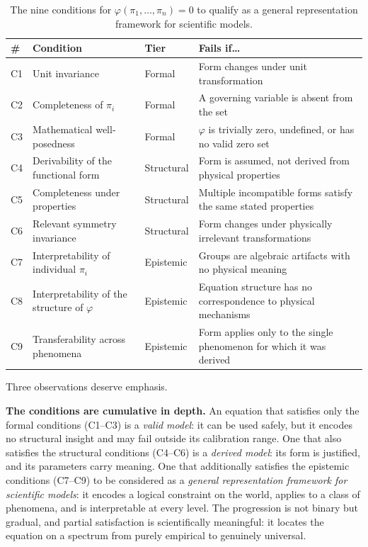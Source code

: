 \begin{table}[ht]
\centering
\caption{The nine conditions for $\varphi(\pi_1,\ldots,\pi_n)=0$
to qualify as a general representation framework for scientific models.}
\label{tab:ucq:conditions}
\renewcommand{\arraystretch}{1.35}
\begin{tabularx}{\textwidth}{%
  >{\centering\arraybackslash}p{0.6cm}
  >{\raggedright\arraybackslash}p{4.0cm}
  >{\raggedright\arraybackslash}p{2.2cm}
  >{\raggedright\arraybackslash}X}
\toprule
\rowcolor{headerbg}
\textbf{\#} & \textbf{Condition} & \textbf{Tier}
            & \textbf{Fails if\ldots} \\
\midrule
C1 & Unit invariance
   & Formal
   & Form changes under unit transformation \\
C2 & Completeness of $\pi_i$
   & Formal
   & A governing variable is absent from the set \\
C3 & Mathematical well-posedness
   & Formal
   & $\varphi$ is trivially zero, undefined, or has no
     valid zero set \\
\midrule
C4 & Derivability of the functional form
   & Structural
   & Form is assumed, not derived from physical properties \\
C5 & Completeness under properties
   & Structural
   & Multiple incompatible forms satisfy the same stated
     properties \\
C6 & Relevant symmetry invariance
   & Structural
   & Form changes under physically irrelevant transformations \\
\midrule
C7 & Interpretability of individual $\pi_i$
   & Epistemic
   & Groups are algebraic artifacts with no physical meaning \\
C8 & Interpretability of the structure of $\varphi$
   & Epistemic
   & Equation structure has no correspondence to physical
     mechanisms \\
C9 & Transferability across phenomena
   & Epistemic
   & Form applies only to the single phenomenon for which
     it was derived \\
\bottomrule
\end{tabularx}
\end{table}

Three observations deserve emphasis.

\medskip

\textbf{The conditions are cumulative in depth.}  An equation that
satisfies only the formal conditions (C1--C3) is a \emph{valid
model}: it can be used safely, but it encodes no structural insight
and may fail outside its calibration range.  One that also
satisfies the structural conditions (C4--C6) is a \emph{derived
model}: its form is justified, and its parameters carry meaning.
One that additionally satisfies the epistemic conditions (C7--C9)
to be considered as a \emph{general representation framework for scientific models}: it encodes a logical
constraint on the world, applies to a class of phenomena, and is
interpretable at every level.  The progression is not binary but
gradual, and partial satisfaction is scientifically meaningful: it
locates the equation on a spectrum from purely empirical to
genuinely universal.

